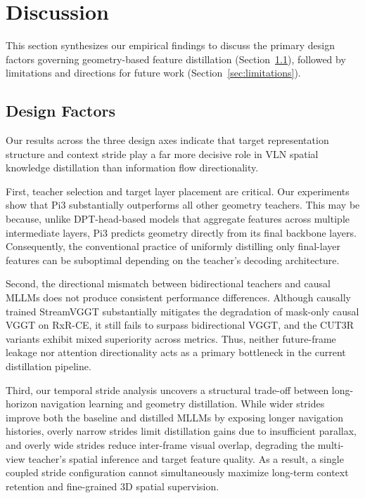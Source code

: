\chapter{Discussion}
\label{ch:discussion}

This section synthesizes our empirical findings to discuss the primary design factors governing geometry-based feature distillation (Section~\ref{sec:design_factors}), followed by limitations and directions for future work (Section~\ref{sec:limitations}).

\section{Design Factors}
\label{sec:design_factors}

Our results across the three design axes indicate that target representation structure and context stride play a far more decisive role in VLN spatial knowledge distillation than information flow directionality.

First, teacher selection and target layer placement are critical. Our experiments show that Pi3 substantially outperforms all other geometry teachers. This may be because, unlike DPT-head-based models that aggregate features across multiple intermediate layers, Pi3 predicts geometry directly from its final backbone layers. Consequently, the conventional practice of uniformly distilling only final-layer features can be suboptimal depending on the teacher's decoding architecture.

Second, the directional mismatch between bidirectional teachers and causal MLLMs does not produce consistent performance differences. Although causally trained StreamVGGT substantially mitigates the degradation of mask-only causal VGGT on RxR-CE, it still fails to surpass bidirectional VGGT, and the CUT3R variants exhibit mixed superiority across metrics. Thus, neither future-frame leakage nor attention directionality acts as a primary bottleneck in the current distillation pipeline.

Third, our temporal stride analysis uncovers a structural trade-off between long-horizon navigation learning and geometry distillation. While wider strides improve both the baseline and distilled MLLMs by exposing longer navigation histories, overly narrow strides limit distillation gains due to insufficient parallax, and overly wide strides reduce inter-frame visual overlap, degrading the multi-view teacher's spatial inference and target feature quality. As a result, a single coupled stride configuration cannot simultaneously maximize long-term context retention and fine-grained 3D spatial supervision.

